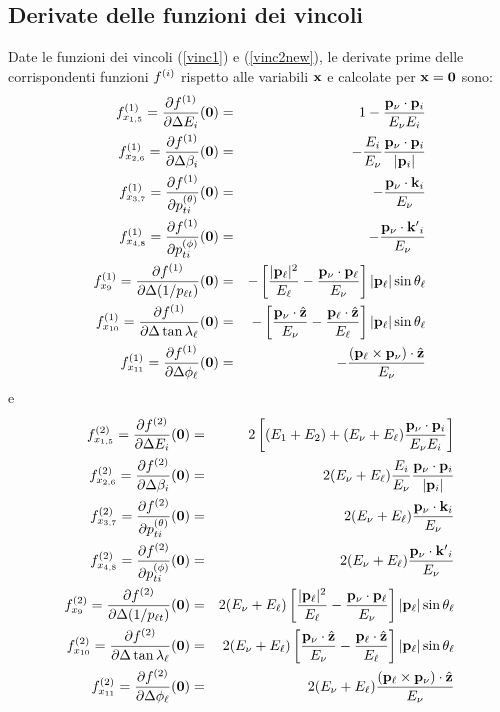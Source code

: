 \subsection{Derivate delle funzioni dei vincoli}
%
Date le funzioni dei vincoli (\ref{vinc1}) e (\ref{vinc2new}), le derivate prime
delle corrispondenti funzioni $f^{(i)}$ rispetto alle variabili ${\bf x}$ e calcolate
per ${\bf x}={\bf 0}$ sono:
\begin{eqnarray}
f^{(1)}_{x_{1,5}}=\frac{\partial f^{(1)}}{\partial\Delta E_i}({\bf 0})&=&1-\frac{{\bf p}_\nu\cdot{\bf p}_i}{E_\nu E_i}\\
f^{(1)}_{x_{2,6}}=\frac{\partial f^{(1)}}{\partial\Delta\beta_i}({\bf 0})&=& -\frac{E_i}{E_\nu}\frac{{\bf p}_\nu\cdot{\bf p}_i}{|{\bf p}_i|}\\
f^{(1)}_{x_{3,7}}=\frac{\partial f^{(1)}}{\partial{p^{(\theta)}_{ti}}}({\bf 0})&=&-\frac{{\bf p}_\nu\cdot{\bf k}_i}{E_\nu}\\
f^{(1)}_{x_{4,8}}=\frac{\partial f^{(1)}}{\partial{p^{(\phi)}_{ti}}}({\bf 0})&=&-\frac{{\bf p}_\nu\cdot{\bf k^\prime}_i}{E_\nu}\\
f^{(1)}_{x_9}=\frac{\partial f^{(1)}}{\partial\Delta(1/p_{\ell t})}({\bf 0})&=&-\left[\frac{|{\bf p}_\ell|^2}{E_\ell}-\frac{{\bf p}_\nu\cdot{\bf p}_\ell}{E_\nu}\right]|{\bf p}_\ell|\sin\theta_\ell\\
f^{(1)}_{x_{10}}=\frac{\partial f^{(1)}}{\partial\Delta\tan\lambda_\ell}({\bf 0})&=&-\left[\frac{{\bf p}_\nu\cdot\hat{\bf z}}{E_\nu}-\frac{{\bf p}_\ell\cdot\hat{\bf z}}{E_\ell}\right]|{\bf p}_\ell|\sin\theta_\ell\\
f^{(1)}_{x_{11}}=\frac{\partial f^{(1)}}{\partial\Delta\phi_\ell}({\bf 0})&=&-\frac{({\bf p}_\ell\times{\bf p}_\nu)\cdot\hat{\bf z}}{E_\nu}\\
\end{eqnarray}
e
\begin{eqnarray}
f^{(2)}_{x_{1,5}}=\frac{\partial f^{(2)}}{\partial\Delta E_i}({\bf 0})&=&2\left[(E_1+E_2)+(E_\nu+E_\ell)\frac{{\bf p}_\nu\cdot{\bf p}_i}{E_\nu E_i}\right]\\
f^{(2)}_{x_{2,6}}=\frac{\partial f^{(2)}}{\partial\Delta\beta_i}({\bf 0})&=&2(E_\nu+E_\ell)\frac{E_i}{E_\nu}\frac{{\bf p}_\nu\cdot{\bf p}_i}{|{\bf p}_i|}\\
f^{(2)}_{x_{3,7}}=\frac{\partial f^{(2)}}{\partial{p^{(\theta)}_{ti}}}({\bf 0})&=&2(E_\nu+E_\ell)\frac{{\bf p}_\nu\cdot{\bf k}_i}{E_\nu}\\
f^{(2)}_{x_{4,8}}=\frac{\partial f^{(2)}}{\partial{p^{(\phi)}_{ti}}}({\bf 0})&=&2(E_\nu+E_\ell)\frac{{\bf p}_\nu\cdot{\bf k^\prime}_i}{E_\nu}\\
f^{(2)}_{x_9}=\frac{\partial f^{(2)}}{\partial\Delta(1/p_{\ell t})}({\bf 0})&=&2(E_\nu+E_\ell)\left[\frac{|{\bf p}_\ell|^2}{E_\ell}-\frac{{\bf p}_\nu\cdot{\bf p}_\ell}{E_\nu}\right]|{\bf p}_\ell|\sin\theta_\ell\\
f^{(2)}_{x_{10}}=\frac{\partial f^{(2)}}{\partial\Delta\tan\lambda_\ell}({\bf 0})&=&2(E_\nu+E_\ell)\left[\frac{{\bf p}_\nu\cdot\hat{\bf z}}{E_\nu}-\frac{{\bf p}_\ell\cdot\hat{\bf z}}{E_\ell}\right]|{\bf p}_\ell|\sin\theta_\ell\\
f^{(2)}_{x_{11}}=\frac{\partial f^{(2)}}{\partial\Delta\phi_\ell}({\bf 0})&=&2(E_\nu+E_\ell)\frac{({\bf p}_\ell\times{\bf p}_\nu)\cdot\hat{\bf z}}{E_\nu}
\end{eqnarray}

